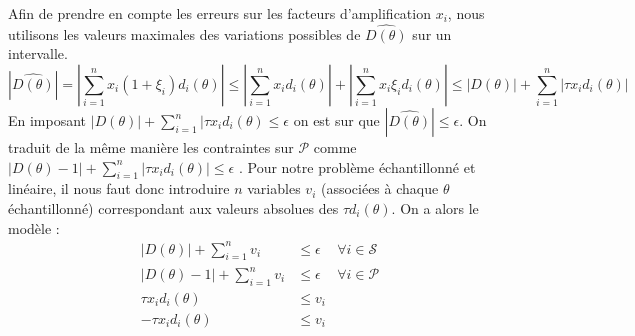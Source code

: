 Afin de prendre en compte les erreurs sur les facteurs d'amplification $x_i$, nous utilisons les valeurs maximales des variations possibles de $\hat{D(\theta)}$ sur un intervalle.\\
\begin{equation}
|\hat{D(\theta)}|  =  |\sum_{i=1}^{n} x_i(1+\xi_i)d_i(\theta)| \leq  |\sum_{i=1}^{n} x_i d_i(\theta)| + |\sum_{i=1}^{n} x_i \xi_i d_i(\theta)|  \leq  |D(\theta)| + \sum_{i=1}^{n} |\tau x_i d_i(\theta)| 
\end{equation}
En imposant $|D(\theta)| + \sum_{i=1}^{n} | \tau x_i d_i(\theta)\leq \epsilon $ on est sur que $|\hat{D(\theta)}|\leq \epsilon$. On traduit de la même manière les contraintes sur $\mathcal{P}$ comme $|D(\theta)-1| + \sum_{i=1}^{n} |\tau x_i d_i(\theta)|\leq \epsilon $ . 
Pour notre problème échantillonné et linéaire, il nous faut donc introduire $n$ variables $v_i$ (associées à chaque $\theta$ échantillonné) correspondant aux valeurs absolues des $\tau d_i(\theta)$. On a alors le modèle : 
\begin{align}
|D(\theta)| + \sum_{i=1}^{n} v_i & \leq  \epsilon & \forall i \in \mathcal{S} \\
|D(\theta)-1| + \sum_{i=1}^{n}v_i & \leq  \epsilon & \forall i \in \mathcal{P} \\
\tau x_i d_i(\theta) & \leq  v_i \\
-\tau x_i d_i(\theta) & \leq  v_i 
\end{align}

